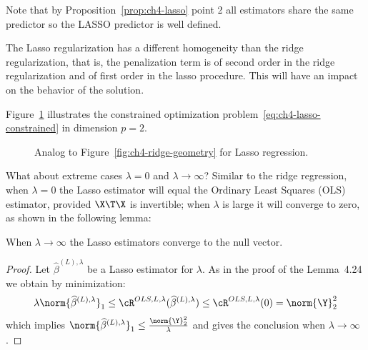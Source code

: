 Note that by Proposition~\ref{prop:ch4-lasso} point 2 all estimators share the same predictor so the LASSO predictor is well defined.

\begin{remark}
The Lasso regularization has a different homogeneity than
the ridge regularization, that is, the penalization term is of second order in
the ridge regularization and of first order in the lasso procedure. This will
have an impact on the behavior of the solution.
\end{remark}

Figure~\ref{fig:ch4-lasso-geometry} illustrates the constrained optimization problem~\eqref{eq:ch4-lasso-constrained} in dimension $p = 2$.

\begin{figure}[h]\centering
\caption{Analog to Figure~\ref{fig:ch4-ridge-geometry} for Lasso regression.}\label{fig:ch4-lasso-geometry}
\end{figure}

What about extreme cases $\lambda = 0$ and $\lambda \to \infty$? Similar to the ridge
regression, when $\lambda = 0$ the Lasso estimator will equal the Ordinary Least
Squares (OLS) estimator, provided $\X\T \X$ is invertible; when $\lambda$ is large it will
converge to zero, as shown in the following lemma:

\begin{lemma}
When $\lambda \to \infty$ the Lasso estimators converge to the null vector.
\end{lemma}

\begin{proof}
Let $\widehat{\beta}^{(L), \lambda}$ be a Lasso estimator for $\lambda$. As in the proof of the
Lemma~4.24 we obtain by minimization:
\begin{equation}\label{eq:ch4-lasso-bound-infty}
\lambda \norm{\widehat{\beta}^{(L), \lambda}}_1 \le \cR^{OLS, L, \lambda}(\widehat{\beta}^{(L), \lambda}) \le \cR^{OLS, L, \lambda}(0) = \norm{\Y}_2^2
\end{equation}
which implies $\norm{\widehat{\beta}^{(L), \lambda}}_1 \le \frac{\norm{\Y}_2^2}{\lambda}$ and gives the conclusion when $\lambda \to \infty$.
\end{proof}

